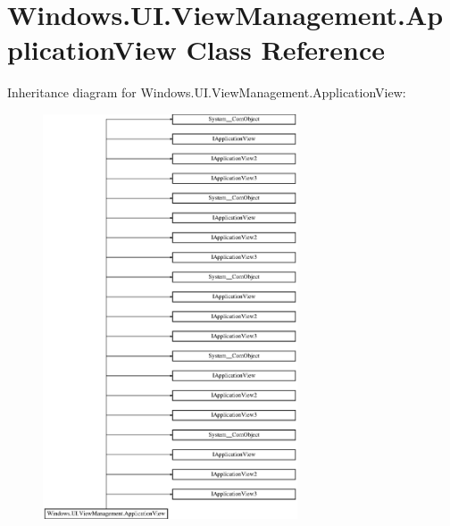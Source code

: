 \hypertarget{class_windows_1_1_u_i_1_1_view_management_1_1_application_view}{}\section{Windows.\+U\+I.\+View\+Management.\+Application\+View Class Reference}
\label{class_windows_1_1_u_i_1_1_view_management_1_1_application_view}
Inheritance diagram for Windows.\+U\+I.\+View\+Management.\+Application\+View\+:\begin{figure}[H]
\begin{center}
\leavevmode
\includegraphics[height=12.000000cm]{class_windows_1_1_u_i_1_1_view_management_1_1_application_view}
\end{center}
\end{figure}
